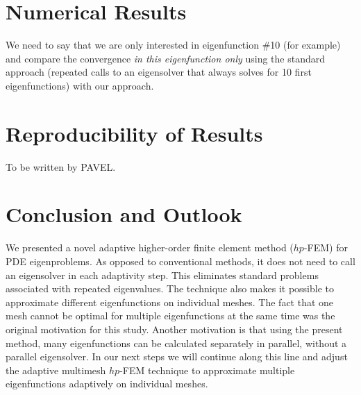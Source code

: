 \documentclass[preprint,12pt]{elsarticle}
\begin{document}









\section{Numerical Results} \label{sec:numer}

{\red We need to say that we are only interested in eigenfunction \#10 (for example)
and compare the convergence {\em in this eigenfunction only} 
using the standard approach (repeated calls to an 
eigensolver that always solves for 10 first eigenfunctions) with our approach.}

\section{Reproducibility of Results} \label{sec:reproducibility}

{\red To be written by PAVEL.}

\section{Conclusion and Outlook}\label{sec:conclusion}

We presented a novel adaptive higher-order finite element method ($hp$-FEM) 
for PDE eigenproblems. As opposed to conventional methods, it does not need
to call an eigensolver in each adaptivity step. This eliminates standard 
problems associated with repeated eigenvalues. The technique also makes it 
possible to approximate different eigenfunctions on individual meshes. 
The fact that one mesh cannot be optimal for multiple eigenfunctions at the
same time was the original motivation for this study. Another motivation is 
that using the present method, many eigenfunctions can be calculated separately 
in parallel, without a parallel eigensolver. In our next steps we will continue 
along this line and adjust the adaptive multimesh $hp$-FEM technique \cite{solin2} 
to approximate multiple eigenfunctions adaptively on individual meshes.
\end{document}
